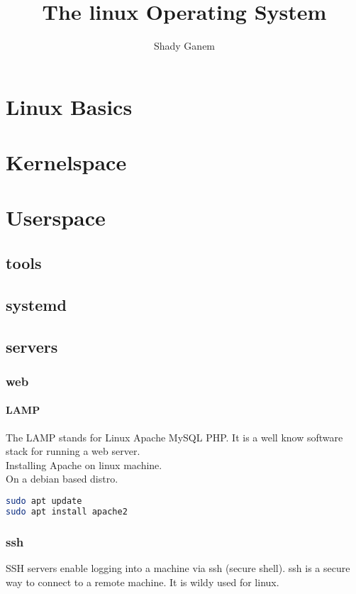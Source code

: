 \documentclass{book}
\title{The linux Operating System}
\author{Shady Ganem}
\begin{document}
\maketitle
\tableofcontents

\part{Linux Basics}

\part{Kernelspace}

\part{Userspace}

\chapter{tools}

\chapter{systemd}

\chapter{servers}

\section{web}
\subsection{LAMP}
The LAMP stands for Linux Apache MySQL PHP. It is a well know software stack for running a web server. \\
Installing Apache on linux machine.\\
On a debian based distro.
\begin{lstlisting}[language=bash]
sudo apt update
sudo apt install apache2
\end{lstlisting}

\section{ssh}
SSH servers enable logging into a machine via ssh (secure shell). ssh is a secure way to connect to a remote machine. It is wildy used for linux.\\
\end{document}
